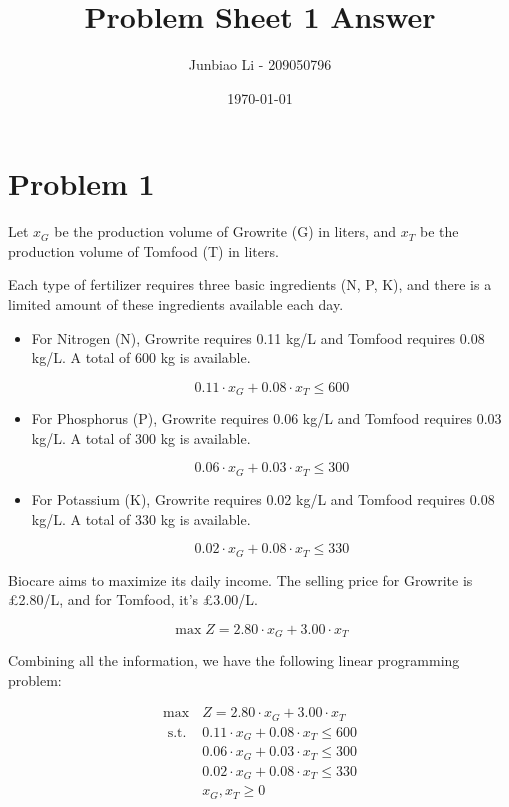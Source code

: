 \documentclass[12pt]{article}
\title{Problem Sheet 1 Answer}
\author{Junbiao Li - 209050796}
\date{\today}
\begin{document}
\maketitle
\tableofcontents


\clearpage
\section{Problem 1}

Let $x_G$ be the production volume of Growrite (G) in liters, and \( x_T \) be the production volume of Tomfood (T) in liters.

Each type of fertilizer requires three basic ingredients (N, P, K), and there is a limited amount of these ingredients available each day.
\begin{itemize}
    \item  For Nitrogen (N), Growrite requires 0.11 kg/L and Tomfood requires 0.08 kg/L. A total of 600 kg is available.
    
    \[ 0.11 \cdot x_G + 0.08 \cdot x_T \leq 600 \]
    
    \item  For Phosphorus (P), Growrite requires 0.06 kg/L and Tomfood requires 0.03 kg/L. A total of 300 kg is available.
    
    \[ 0.06 \cdot x_G + 0.03 \cdot x_T \leq 300 \]
    
    \item  For Potassium (K), Growrite requires 0.02 kg/L and Tomfood requires 0.08 kg/L. A total of 330 kg is available.
    
    \[ 0.02 \cdot x_G + 0.08 \cdot x_T \leq 330 \]
    
\end{itemize}
    
Biocare aims to maximize its daily income. The selling price for Growrite is £2.80/L, and for Tomfood, it's £3.00/L.

\[ \max Z = 2.80 \cdot x_G + 3.00 \cdot x_T \]


Combining all the information, we have the following linear programming problem:

\[
\begin{array}{cc}
 \max & Z = 2.80 \cdot x_G + 3.00 \cdot x_T \\
\text { s.t. } & 0.11 \cdot x_G + 0.08 \cdot x_T \leq 600 \\
& 0.06 \cdot x_G + 0.03 \cdot x_T \leq 300 \\
& 0.02 \cdot x_G + 0.08 \cdot x_T \leq 330 \\
& x_G, x_T \geq 0 \\
\end{array}
\]
\end{document}
